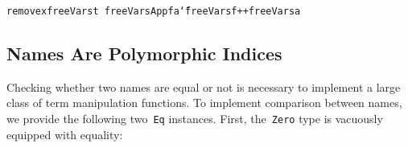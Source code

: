 \documentclass[9pt,authoryear]{sigplanconf}
\begin{document}
{{}\vphantom{$\{$}}\texttt{\mbox{\hspace{0.50em}}}\texttt{\mbox{\hspace{0.50em}}}\texttt{\mbox{\hspace{0.50em}}}\texttt{remove}\texttt{\mbox{\hspace{0.50em}}}\texttt{x}\texttt{\mbox{\hspace{0.50em}}}\texttt{\makebox[1.22ex][l]{$ {(} $}}\texttt{freeVars\makebox[1.22ex][c]{\_{}}}\texttt{\mbox{\hspace{0.50em}}}\texttt{t}\texttt{\makebox[1.22ex][r]{$ {)} $}}\texttt{{\nopagebreak \newline%
}\vphantom{$\{$}}\texttt{freeVars\makebox[1.22ex][c]{\_{}}}\texttt{\mbox{\hspace{0.50em}}}\texttt{\makebox[1.22ex][l]{$ {(} $}}\texttt{App}\texttt{\mbox{\hspace{0.50em}}}\texttt{f}\texttt{\mbox{\hspace{0.50em}}}\texttt{a}\texttt{\makebox[1.22ex][r]{$ {)} $}}\texttt{\mbox{\hspace{0.50em}}}\texttt{{\char `\=}}\texttt{\mbox{\hspace{0.50em}}}\texttt{freeVars\makebox[1.22ex][c]{\_{}}}\texttt{\mbox{\hspace{0.50em}}}\texttt{f}\texttt{\mbox{\hspace{0.50em}}}\texttt{++}\texttt{\mbox{\hspace{0.50em}}}\texttt{freeVars\makebox[1.22ex][c]{\_{}}}\texttt{\mbox{\hspace{0.50em}}}\texttt{a}\texttt{{\nopagebreak \newline%
}\vphantom{$\{$}}%


\subsection{Names Are Polymorphic Indices}

%
Checking whether two names are equal or not is necessary to implement a large 
    class of term manipulation functions.
    To implement comparison between names, we provide the following two{~}\texttt{Eq} instances.
    First, the{~}\texttt{Zero} type is vacuously equipped with equality{:}%


{\nopagebreak }
\end{document}
